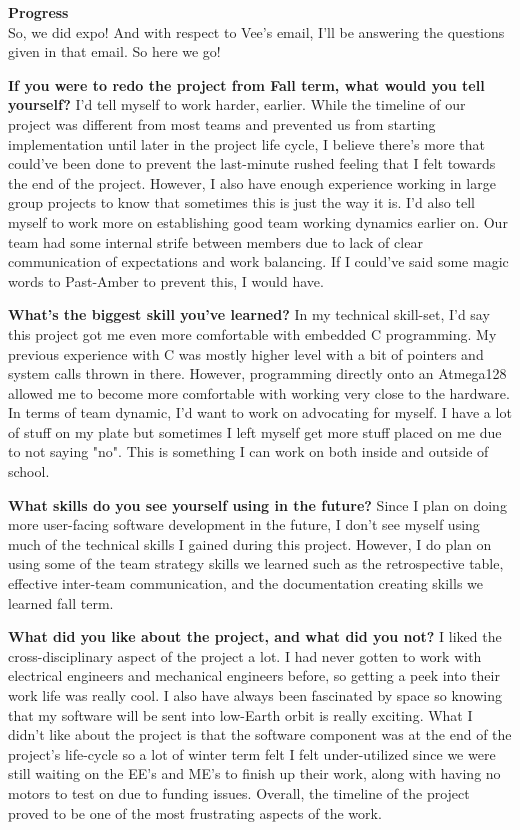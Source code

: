 \textbf{Progress} \\
So, we did expo! And with respect to Vee's email, I'll be answering the questions given in that email. So here we go!

\textbf{If you were to redo the project from Fall term, what would you tell yourself?}
I'd tell myself to work harder, earlier. While the timeline of our project was different from most teams and prevented us from starting implementation 
until later in the project life cycle, I believe there's more that could've been done to prevent the last-minute rushed feeling that I felt towards the 
end of the project. However, I also have enough experience working in large group projects to know that sometimes this is just the way it is. I'd also 
tell myself to work more on establishing good team working dynamics earlier on. Our team had some internal strife between members due to lack of clear 
communication of expectations and work balancing. If I could've said some magic words to Past-Amber to prevent this, I would have.

\textbf{What's the biggest skill you've learned?}
In my technical skill-set, I'd say this project got me even more comfortable with embedded C programming. My previous experience with C was mostly higher 
level with a bit of pointers and system calls thrown in there. However, programming directly onto an Atmega128 allowed me to become more comfortable with 
working very close to the hardware. In terms of team dynamic, I'd want to work on advocating for myself. I have a lot of stuff on my plate but sometimes 
I left myself get more stuff placed on me due to not saying "no". This is something I can work on both inside and outside of school.

\textbf{What skills do you see yourself using in the future?}
Since I plan on doing more user-facing software development in the future, I don't see myself using much of the technical skills I gained during this 
project. However, I do plan on using some of the team strategy skills we learned such as the retrospective table, effective inter-team communication, and 
the documentation creating skills we learned fall term.

\textbf{What did you like about the project, and what did you not?}
I liked the cross-disciplinary aspect of the project a lot. I had never gotten to work with electrical engineers and mechanical engineers before, so 
getting a peek into their work life was really cool. I also have always been fascinated by space so knowing that my software will be sent into low-Earth 
orbit is really exciting. What I didn't like about the project is that the software component was at the end of the project's life-cycle so a lot of 
winter term felt I felt under-utilized since we were still waiting on the EE's and ME's to finish up their work, along with having no motors to test on 
due to funding issues. Overall, the timeline of the project proved to be one of the most frustrating aspects of the work.

